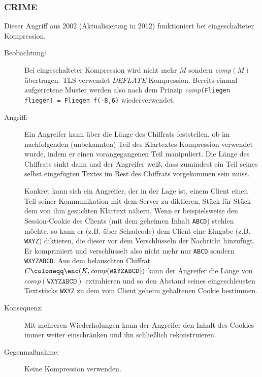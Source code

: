\subsubsection{CRIME}
\label{sec:keyex:crime}
Dieser Angriff aus 2002 (Aktualisierung in 2012) funktioniert bei
eingeschalteter Kompression. 
\begin{description}
\item[Beobachtung:] Bei eingeschalteter Kompression wird nicht mehr $M$
  sondern \emph{comp}$(M)$ übertragen. TLS verwendet
  \emph{DEFLATE}-Kompression. Bereits einmal aufgetretene Muster werden
  also nach dem Prinzip \emph{comp}\texttt{(Fliegen fliegen) = Fliegen
    f(-8,6)} wiederverwendet.
\item[Angriff:] Ein Angreifer kann über die Länge des Chiffrats
  feststellen, ob im nachfolgenden (unbekannten) Teil des Klartextes
  Kompression verwendet wurde, indem er einen vorangegangenen Teil
  manipuliert. Die Länge des Chiffrats sinkt dann und der Angreifer weiß,
  dass zumindest ein Teil seines selbst eingefügten Textes im Rest des
  Chiffrats vorgekommen sein muss.
  
  Konkret kann sich ein Angreifer, der in der Lage ist, einem Client
  einen Teil seiner Kommunikation mit dem Server zu diktieren, Stück für
  Stück dem von ihm gesuchten Klartext nähern. Wenn er beispielsweise den
  Session-Cookie des Clients (mit dem geheimen Inhalt \texttt{ABCD})
  stehlen möchte, so kann er (z.B. über Schadcode) dem Client eine Eingabe
  (z.B. \texttt{WXYZ}) diktieren, die dieser vor dem Verschlüsseln der
  Nachricht hinzufügt. Er komprimiert und verschlüsselt also nicht mehr
  nur \texttt{ABCD} sondern \texttt{WXYZABCD}. Aus dem belauschten
  Chiffrat $C \coloneqq \enc(K, \mathit{comp}(\mathtt{WXYZABCD}))$ kann der
  Angreifer die Länge von $\mathit{comp}(\mathtt{WXYZABCD})$ extrahieren
  und so den Abstand seines eingeschleusten Textstücks \texttt{WXYZ} zu
  dem vom Client geheim gehaltenen Cookie bestimmen.
\item[Konsequenz:] Mit mehreren Wiederholungen kann der Angreifer den
  Inhalt des Cookies immer weiter einschränken und ihn schließlich
  rekonstruieren.
\item[Gegenmaßnahme:] Keine Kompression verwenden.
\end{description}

